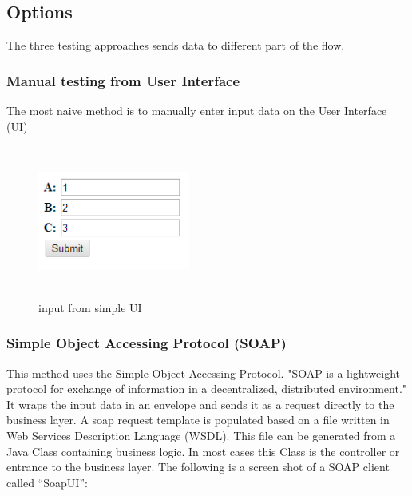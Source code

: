 \documentclass[12pt]{article}
\begin{document}
\subsection{Options}
The three testing approaches sends data to different part of the flow.
\subsubsection{Manual testing from User Interface}
The most naive method is to manually enter input data on the User Interface (UI) \\
		
\begin{figure}[ht!]
\centering
\includegraphics[width=5cm,height=5cm,keepaspectratio]{img/ui.jpg}
\caption{input from simple UI}
\label{overflow}
\end{figure}

\subsubsection{Simple Object Accessing Protocol (SOAP)}
	This method uses the Simple Object Accessing Protocol. "SOAP is a lightweight protocol for exchange of information in a decentralized, distributed environment."\cite{soap} It wraps the input data in an envelope and sends it as a request directly to the business layer. A soap request template is populated based on a file written in Web Services Description Language (WSDL). This file can be generated from a Java Class containing business logic. In most cases this Class is the controller or entrance to the business layer. The following is a screen shot of a SOAP client called “SoapUI”:
	
\end{document}
